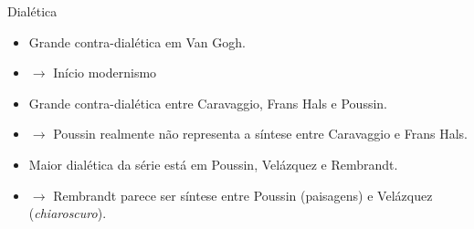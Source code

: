 \documentclass{beamer}
\begin{document}
\begin{frame}{Dialética}
      \begin{itemize}

  \item<1> Grande contra-dialética em Van Gogh.
  \item<1> $\to$ Início modernismo

  \item<2> Grande contra-dialética entre Caravaggio, Frans Hals e Poussin.
  \item<2> $\to$ Poussin realmente não representa a síntese entre Caravaggio e Frans Hals.

  \item<3> Maior dialética da série está em Poussin, Velázquez e Rembrandt.
  \item<3> $\to$ Rembrandt parece ser síntese entre Poussin (paisagens) e Velázquez (\textit{chiaroscuro}).

    \end{itemize}
\end{frame}







\end{document}
